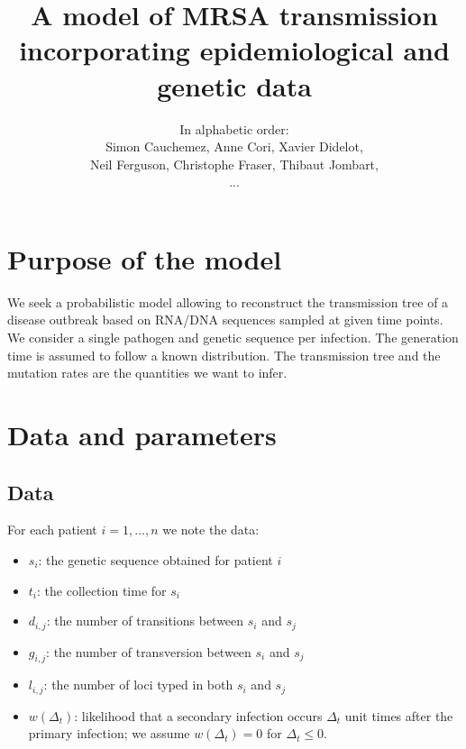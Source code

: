 \documentclass[10pt]{article}
\author{In alphabetic order: \\Simon Cauchemez, Anne Cori, Xavier Didelot, \\Neil Ferguson, Christophe Fraser, Thibaut Jombart,\\...}
\title{A model of MRSA transmission incorporating epidemiological and genetic data}
\begin{document}
\maketitle

\section*{Purpose of the model}
We seek a probabilistic model allowing to reconstruct the transmission tree of a disease outbreak based on RNA/DNA sequences sampled at given time points.
We consider a single pathogen and genetic sequence per infection.
The generation time is assumed to follow a known distribution.
The transmission tree and the mutation rates are the quantities we want to infer.



\section*{Data and parameters}

\subsection*{Data}
For each patient $i=1,\ldots,n$ we note the data:
\begin{itemize}
	\item $s_i$: the genetic sequence obtained for patient $i$
	\item $t_i$: the collection time for $s_i$
 	\item $d_{i,j}$: the number of transitions between $s_i$ and $s_j$
 	\item $g_{i,j}$: the number of transversion between $s_i$ and $s_j$
 	\item $l_{i,j}$: the number of loci typed in both $s_i$ and $s_j$
 	\item $w(\Delta_t)$: likelihood that a secondary infection occurs $\Delta_t$ unit times after the primary infection; we assume $w(\Delta_t)=0$ for $\Delta_t \leq 0$.
\end{itemize}
\end{document}
